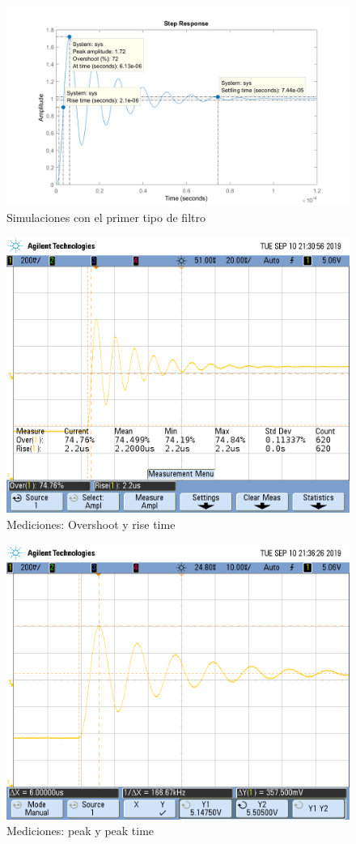 \documentclass{article}
\begin{document}
\begin{figure}[H]
\centering
\includegraphics[width=1\linewidth]{images/todo.PNG}
\caption{Simulaciones con el primer tipo de filtro}
\label{fig:sim}
\end{figure}

\begin{figure}[H]
\centering
\includegraphics[width=0.8\linewidth]{images/os_and_trise.PNG}
\caption{Mediciones: Overshoot y rise time}
\label{fig:osandtr}
\end{figure}

\begin{figure}[H]
\centering
\includegraphics[width=0.8\linewidth]{images/tpeak_vpeak.PNG}
\caption{Mediciones: peak y peak time}
\label{fig:peak}
\end{figure}
\end{document}
